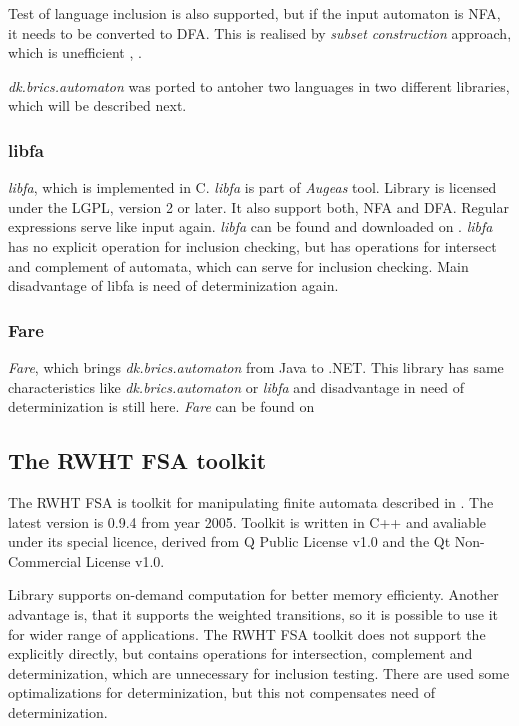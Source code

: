 Test of language inclusion is also supported, but if the input automaton is NFA, it needs to be converted to DFA. 
This is realised by \emph{subset construction} approach, which is unefficient \cite{cav06}, \cite{antichain}.

\emph{dk.brics.automaton} was ported to antoher two languages in two different libraries, which will be described next.

\subsubsection{libfa}
\emph{libfa}, which is implemented in C. \emph{libfa} is part
of \emph{Augeas} tool. Library is licensed under the LGPL, version 2 or later. It also support both, NFA and DFA. Regular expressions serve like input again.
\emph{libfa} can be found and downloaded on \cite{libfa}.
\emph{libfa} has no explicit operation for inclusion checking, but has operations for intersect and complement of automata, which can serve for inclusion checking.
Main disadvantage of libfa is need of determinization again.

\subsubsection{Fare}
\emph{Fare}, which brings \emph{dk.brics.automaton} from Java to .NET. 
This library has same characteristics like \emph{dk.brics.automaton} or \emph{libfa} and disadvantage in need of determinization is still here. 
\emph{Fare} can be found on \cite{fare}

\subsection{The RWHT FSA toolkit}
The RWHT FSA is toolkit for manipulating finite automata described in \cite{kanthakN04}. The latest version is 0.9.4 from year 2005. Toolkit is written in C++
and avaliable under its special licence, derived from Q Public License v1.0 and the Qt Non-Commercial License v1.0. 

Library supports on-demand computation for better memory efficienty. Another advantage is, that it supports the weighted transitions, so it is possible to use it
for wider range of applications. The RWHT FSA toolkit does not support the explicitly directly, but contains operations for intersection, complement and
determinization, which are unnecessary for inclusion testing. There are used some optimalizations for determinization, but this not compensates need of 
determinization. 

